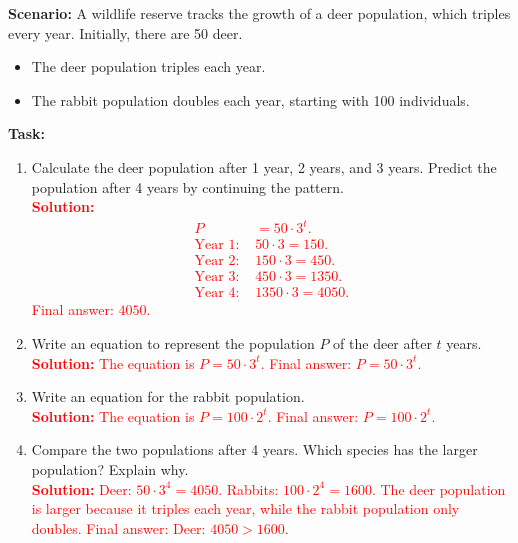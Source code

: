 \documentclass[9pt]{article}
\begin{document}
\vspace{1em}
\begin{tcolorbox}[colframe=black!60, colback=white, 
coltitle=black, colbacktitle=black!15, fonttitle=\bfseries\Large, 
title=Performance Task: Predicting Population Growth, halign title=center, left=10pt, right=10pt, top=10pt, bottom=20pt]
\textbf{Scenario:} A wildlife reserve tracks the growth of a deer population, which triples every year. Initially, there are 50 deer.
\begin{itemize}
    \item The deer population triples each year.
    \item The rabbit population doubles each year, starting with 100 individuals.
\end{itemize}
\textbf{Task:}
\begin{enumerate}[itemsep=.5em]
    \item  Calculate the deer population after 1 year, 2 years, and 3 years. Predict the population after 4 years by continuing the pattern.\\
    \textcolor{red}{\textbf{Solution:} 
    \begin{align*}
    P &= 50 \cdot 3^t. \\
    \text{Year 1: } & 50 \cdot 3 = 150. \\
    \text{Year 2: } & 150 \cdot 3 = 450. \\
    \text{Year 3: } & 450 \cdot 3 = 1350. \\
    \text{Year 4: } & 1350 \cdot 3 = 4050.
    \end{align*}
    Final answer: \(4050\).}

    \item Write an equation to represent the population \(P\) of the deer after \(t\) years.\\
    \textcolor{red}{\textbf{Solution:} The equation is \(P = 50 \cdot 3^t\). Final answer: \(P = 50 \cdot 3^t\).}

    \item Write an equation for the rabbit population.\\
    \textcolor{red}{\textbf{Solution:} The equation is \(P = 100 \cdot 2^t\). Final answer: \(P = 100 \cdot 2^t\).}

    \item Compare the two populations after 4 years. Which species has the larger population? Explain why.\\
    \textcolor{red}{\textbf{Solution:} 
    Deer: \(50 \cdot 3^4 = 4050.\) 
    Rabbits: \(100 \cdot 2^4 = 1600.\) 
    The deer population is larger because it triples each year, while the rabbit population only doubles. Final answer: Deer: \(4050 > 1600\).}


\end{enumerate}
\end{tcolorbox}
\end{document}
